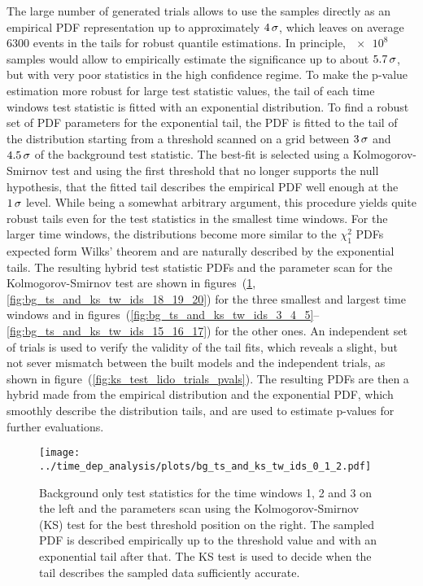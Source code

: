 The large number of generated trials allows to use the samples directly as an empirical PDF representation up to approximately $\num{4}\,\sigma$, which leaves on average $\num{6300}$ events in the tails for robust quantile estimations.
In principle, $\num{e8}$ samples would allow to empirically estimate the significance up to about $\num{5.7}\,\sigma$, but with very poor statistics in the high confidence regime.
To make the p-value estimation more robust for large test statistic values, the tail of each time windows test statistic is fitted with an exponential distribution.
To find a robust set of PDF parameters for the exponential tail, the PDF is fitted to the tail of the distribution starting from a threshold scanned on a grid between $\num{3}\,\sigma$ and $\num{4.5}\,\sigma$ of the background test statistic.
The best-fit is selected using a Kolmogorov-Smirnov test \cite{Horn:1977KSTest} and using the first threshold that no longer supports the null hypothesis, that the fitted tail describes the empirical PDF well enough at the $\num{1}\,\sigma$ level.
While being a somewhat arbitrary argument, this procedure yields quite robust tails even for the test statistics in the smallest time windows.
For the larger time windows, the distributions become more similar to the $\chi^2_1$ PDFs expected form Wilks' theorem and are naturally described by the exponential tails.
The resulting hybrid test statistic PDFs and the parameter scan for the Kolmogorov-Smirnov test are shown in figures~(\ref{fig:bg_ts_and_ks_tw_ids_0_1_2},\ref{fig:bg_ts_and_ks_tw_ids_18_19_20}) for the three smallest and largest time windows and in figures~(\ref{fig:bg_ts_and_ks_tw_ids_3_4_5}--\ref{fig:bg_ts_and_ks_tw_ids_15_16_17}) for the other ones.
An independent set of trials is used to verify the validity of the tail fits, which reveals a slight, but not sever mismatch between the built models and the independent trials, as shown in figure~(\ref{fig:ks_test_lido_trials_pvals}).
The resulting PDFs are then a hybrid made from the empirical distribution and the exponential PDF, which smoothly describe the distribution tails, and are used to estimate p-values for further evaluations.

\begin{figure}[htbp]
  \centering
  \texttt{[image: ../time\_dep\_analysis/plots/bg\_ts\_and\_ks\_tw\_ids\_0\_1\_2.pdf]}
  \caption[Background test statistics for the time windows 1, 2 and 3]{
    Background only test statistics for the time windows 1, 2 and 3 on the left and the parameters scan using the Kolmogorov-Smirnov (KS) test for the best threshold position on the right.
    The sampled PDF is described empirically up to the threshold value and with an exponential tail after that.
    The KS test is used to decide when the tail describes the sampled data sufficiently accurate.
  }
  \label{fig:bg_ts_and_ks_tw_ids_0_1_2}
\end{figure}

